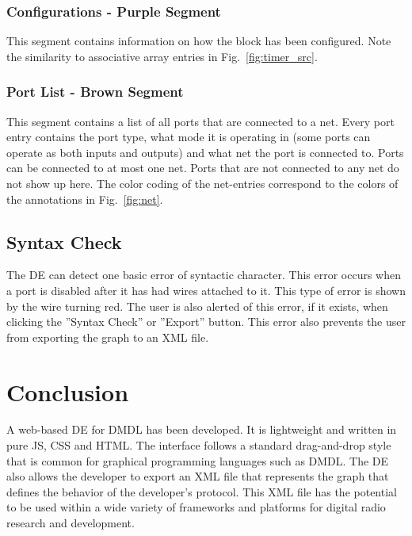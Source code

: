 \documentclass[journal,comsoc]{IEEEtran}
\begin{document}
\subsubsection{Configurations - Purple Segment}
This segment contains information on how the block has been configured. Note
the similarity to associative array entries in Fig.~\ref{fig:timer_src}.

\subsubsection{Port List - Brown Segment}
This segment contains a list of all ports that are connected to a net. Every port entry contains
the port type, what mode it is operating in (some ports can operate as both inputs and outputs)
and what net the port is connected to. Ports can be connected to at most one net. Ports that
are not connected to any net do not show up here. The color coding of the net-entries correspond
to the colors of the annotations in Fig.~\ref{fig:net}.

\subsection{Syntax Check}
\label{sec:syntax}
The DE can detect one basic error of syntactic character. This error occurs when a port is
disabled after it has had wires attached to it. This type of error is shown by the wire turning
red. The user is also alerted of this error, if it exists, when clicking the ''Syntax Check''
or ''Export'' button. This error also prevents the user from exporting the graph to an XML file.

\section{Conclusion}
A web-based DE for DMDL has been developed. It is lightweight and written in pure JS, CSS and HTML.
The interface follows a standard drag-and-drop style that is common for graphical programming
languages such as DMDL. The DE also allows the developer to export an XML file that represents the
graph that defines the behavior of the developer's protocol. This XML file has the potential to
be used within a wide variety of frameworks and platforms for digital radio research and
development.
\end{document}
